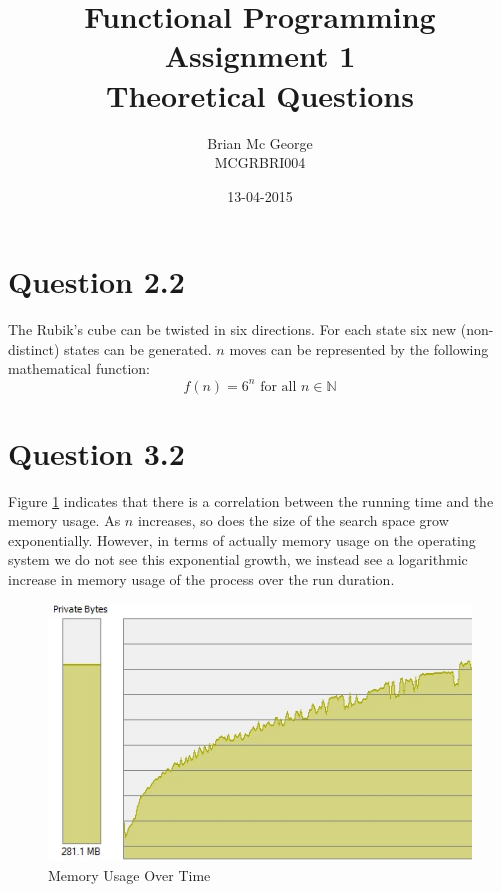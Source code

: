 \documentclass[]{article}
\title{Functional Programming Assignment 1\\Theoretical Questions}
\date{13-04-2015}
\author{Brian Mc George\\MCGRBRI004
}
\begin{document}
\maketitle
\newpage

\section*{Question 2.2}
The Rubik's cube can be twisted in six directions. For each state six new (non-distinct) states can be generated. \(n\) moves can be represented by the following mathematical function:
\begin{equation}\label{func_states}	
	f(n)=6^n\text{ for all }n \in\mathbb{N}
\end{equation}

\section*{Question 3.2}
Figure \ref{fig:memory_usage} indicates that there is a correlation between the running time and the memory usage. As \(n\) increases, so does the size of the search space grow exponentially. However, in terms of actually memory usage on the operating system we do not see this exponential growth, we instead see a logarithmic increase in memory usage of the process over the run duration.
\begin{figure}[H]
\centering
\includegraphics[width=1\linewidth]{memory_usage.jpg}
\caption{Memory Usage Over Time}
\label{fig:memory_usage}
\end{figure}
\end{document}
